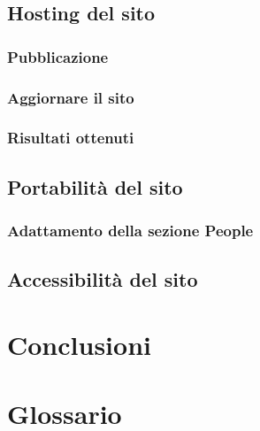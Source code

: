 \documentclass[target=bach,aauheader=]{thud}
\begin{document}
\section{Hosting del sito}

\subsection{Pubblicazione}

\subsection{Aggiornare il sito}

\subsection{Risultati ottenuti}

\section{Portabilità del sito}

\subsection{Adattamento della sezione People}

\section{Accessibilità del sito}

\chapter{Conclusioni}

\appendix


\chapter{Glossario}


\backmatter
\end{document}
